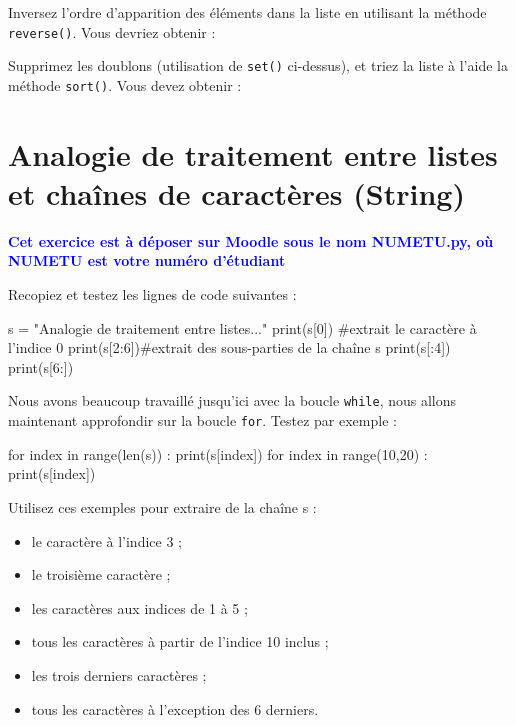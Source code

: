  Inversez l'ordre d'apparition des éléments dans la liste en utilisant la méthode \texttt{reverse()}. Vous devriez obtenir :

\begin{python}
\end{python}

Supprimez les doublons (utilisation de \texttt{set()} ci-dessus), et triez la liste à l'aide la méthode \texttt{sort()}. Vous devez obtenir :

\begin{python}
\end{python}

\section{Analogie de traitement entre listes et chaînes de caractères (String)}

\textbf{\textcolor{blue}{Cet exercice est à déposer sur Moodle sous le nom NUMETU.py, où NUMETU est votre numéro d'étudiant}}

\exer
 Recopiez et testez les lignes de code suivantes :

\begin{python}
s = "Analogie de traitement entre listes..."
print(s[0]) #extrait le caractère à l'indice 0
print(s[2:6])#extrait des sous-parties de la chaîne s
print(s[:4])
print(s[6:])
\end{python}

Nous avons beaucoup travaillé jusqu'ici avec la boucle \texttt{while}, nous allons maintenant approfondir sur la boucle \texttt{for}. Testez par exemple :
\begin{python}
for index in range(len(s)) :
  print(s[index])
for index in range(10,20) :
  print(s[index])
\end{python}

 Utilisez ces exemples pour extraire de la chaîne s :
\begin{itemize}
  \item le caractère à l'indice 3 ;
  \item le troisième caractère ;
  \item les caractères aux indices de 1 à 5 ;
  \item tous les caractères à partir de l'indice 10 inclus ;
  \item les trois derniers caractères ;
  \item tous les caractères à l'exception des 6 derniers.
\end{itemize}

